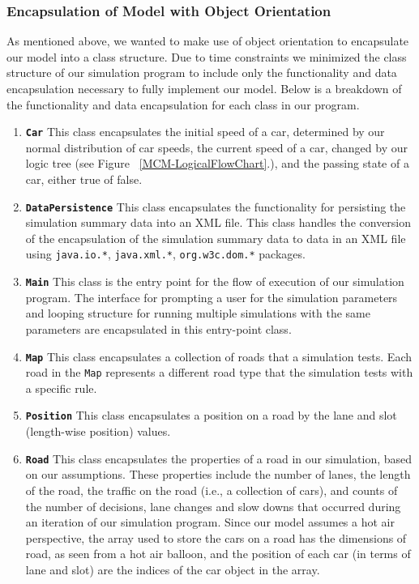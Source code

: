 \documentclass{amsart}
\begin{document}
		\subsubsection{Encapsulation of Model with Object Orientation}
		As mentioned above, we wanted to make use of object orientation to encapsulate our model into a class structure. Due to time constraints we minimized the class structure of our simulation program to include only the functionality and data encapsulation necessary to fully implement our model. Below is a breakdown of the functionality and data encapsulation for each class in our program.
		\begin{enumerate}
			\item{\textbf{\texttt{Car}}
				This class encapsulates the initial speed of a car, determined by our normal distribution of car speeds, the current speed of a car, changed by our logic tree (see Figure ~\ref{MCM-LogicalFlowChart}.), and the passing state of a car, either true of false. 
			}
			\item{\textbf{\texttt{DataPersistence}}
				This class encapsulates the functionality for persisting the simulation summary data into an XML file. This class handles the conversion of the encapsulation of the simulation summary data to data in an XML file using \texttt{java.io.*}, \texttt{java.xml.*}, \texttt{org.w3c.dom.*} packages.
			}
			\item{\textbf{\texttt{Main}}
				This class is the entry point for the flow of execution of our simulation program. The interface for prompting a user for the simulation parameters and looping structure for running multiple simulations with the same parameters are encapsulated in this entry-point class.
			}
			\item{\textbf{\texttt{Map}}
				This class encapsulates a collection of roads that a simulation tests. Each road in the \texttt{Map} represents a different road type that the simulation tests with a specific rule.
			}
			\item{\textbf{\texttt{Position}}
				This class encapsulates a position on a road by the lane and slot (length-wise position) values.
			}
			\item{\textbf{\texttt{Road}}
				This class encapsulates the properties of a road in our simulation, based on our assumptions. These properties include the number of lanes, the length of the road, the traffic on the road (i.e., a collection of cars), and counts of the number of decisions, lane changes and slow downs that occurred during an iteration of our simulation program. Since our model assumes a hot air perspective, the array used to store the cars on a road has the dimensions of road, as seen from a hot air balloon, and the position of each car (in terms of lane and slot) are the indices of the car object in the array.
}
\end{enumerate}
\end{document}
